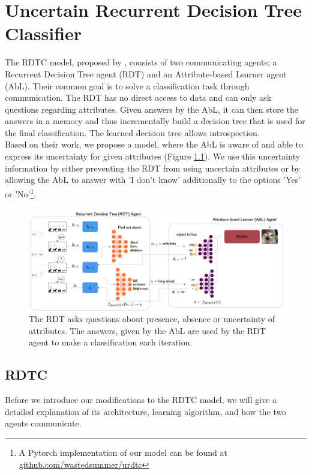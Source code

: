 \documentclass[a4paper,cleardoubleempty,BCOR1cm, 11pt]{report}
\begin{document}
\chapter{Uncertain Recurrent Decision Tree Classifier} %
The RDTC model, proposed by \citet{alaniz2019explainable}, consists of two communicating agents; a Recurrent Decision Tree agent (RDT) and an Attribute-based Learner agent (AbL). Their common goal is to solve a classification task through communication. The RDT has no direct access to data and can only ask questions regarding attributes. Given answers by the AbL, it can then store the answers in a memory and thus incrementally build a decision tree that is used for the final classification. The learned decision tree allows introspection.\\
Based on their work, we propose a model, where the AbL is aware of and able to express its uncertainty for given attributes (Figure \ref{fig:uncertainRDTC}). We use this uncertainty information by either preventing the RDT from using uncertain attributes or by allowing the AbL to answer with 'I don't know' additionally to the options 'Yes' or 'No'\footnote{A Pytorch implementation of our model can be found at \url{github.com/wastedsummer/urdtc}}.



\begin{figure}
	\centering
	\includegraphics[width=1\textwidth]{images/uncertaintRDTC.pdf} 
	\caption{The RDT asks questions about presence, absence or uncertainty of attributes. The answers, given by the AbL are used by the RDT agent to make a classification each iteration.}
	\label{fig:uncertainRDTC}
\end{figure}

\section{RDTC} 
Before we introduce our modifications to the RDTC model, we will give a detailed explanation of its architecture, learning algorithm, and how the two agents communicate.
\end{document}
